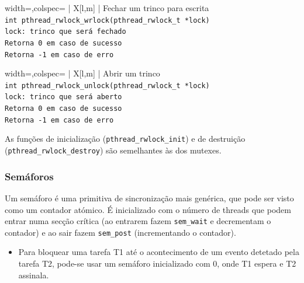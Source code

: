 \documentclass[11pt]{article}
\begin{document}
\begin{tblr}{width=\linewidth,colspec={ | X[l,m] | }}
    \hline
    \centering Fechar um trinco para escrita                      \\\hline
    \lstinline|int pthread_rwlock_wrlock(pthread_rwlock_t *lock)| \\\hline
    \lstinline|lock: trinco que será fechado|                     \\\hline
    \lstinline|Retorna 0 em caso de sucesso|                      \\
    \lstinline|Retorna -1 em caso de erro|                        \\\hline
\end{tblr}

\begin{tblr}{width=\linewidth,colspec={ | X[l,m] | }}
    \hline
    \centering Abrir um trinco                                    \\\hline
    \lstinline|int pthread_rwlock_unlock(pthread_rwlock_t *lock)| \\\hline
    \lstinline|lock: trinco que será aberto|                      \\\hline
    \lstinline|Retorna 0 em caso de sucesso|                      \\
    \lstinline|Retorna -1 em caso de erro|                        \\\hline
\end{tblr}

As funções de inicialização (\lstinline|pthread_rwlock_init|) e de destruição (\lstinline|pthread_rwlock_destroy|) são semelhantes às dos mutexes.

\subsubsection{Semáforos}

Um semáforo é uma primitiva de sincronização mais genérica, que pode ser visto como um contador atómico. É inicializado com o número de threads que podem entrar numa secção crítica (ao entrarem fazem \lstinline|sem_wait| e decrementam o contador) e ao sair fazem \lstinline|sem_post| (incrementando o contador).

\begin{itemize}
    \item Para bloquear uma tarefa T1 até o acontecimento de um evento detetado pela tarefa T2, pode-se usar um semáforo inicializado com 0, onde T1 espera e T2 assinala.
\end{itemize}
\end{document}
